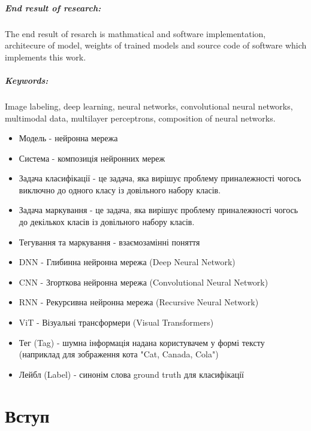 \documentclass{udstu}
\begin{document}
\paragraph{\textbf{End result of research:}}
The end result of resarch is mathmatical and software implementation, architecure of model,
weights of trained models and source code of software which implements this work.

\paragraph{\textbf{Keywords:}}
Image labeling, deep learning, neural networks, convolutional neural networks, multimodal data,
multilayer perceptrons, composition of neural networks.


\shortings

\begin{itemize}[*]
	\item Модель - нейронна мережа
	\item Система - композиція нейронних мереж
	\item Задача класифікації - це задача, яка вирішує проблему приналежності чогось
	виключно до одного класу із довільного набору класів.
	\item Задача маркування - це задача, яка вирішує проблему приналежності чогось
	до декількох класів із довільного набору класів.
	\item Тегування та маркування - взаємозамінні поняття
	\item DNN - Глибинна нейронна мережа (Deep Neural Network)
	\item CNN - Згорткова нейронна мережа (Convolutional Neural Network)
	\item RNN - Рекурсивна нейронна мережа (Recursive Neural Network)
	\item ViT - Візуальні трансформери (Visual Transformers)
	\item Тег (Tag) - шумна інформація надана користувачем у формі тексту
	(наприклад для зображення кота "Cat, Canada, Cola")
	\item Лейбл (Label) - синонім слова ground truth для класифікації
\end{itemize}


\tableofcontents


\chapter{Вступ}
\end{document}
